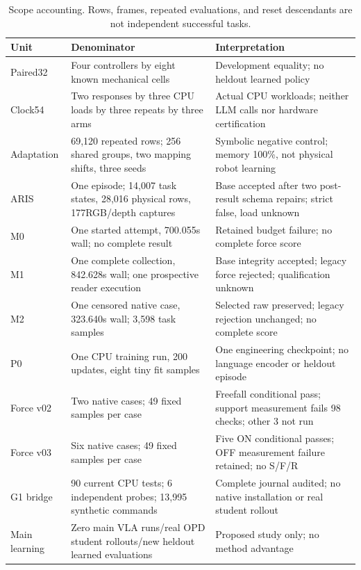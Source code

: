 \documentclass{article}
\begin{document}
\begin{table}[h]
\caption{Scope accounting. Rows, frames, repeated evaluations, and reset descendants are not independent successful tasks.}
\centering\small
\begin{tabular}{p{}p{}p{}}\toprule
Unit&Denominator&Interpretation\\\midrule
Paired32&Four controllers by eight known mechanical cells&Development equality; no heldout learned policy\\
Clock54&Two responses by three CPU loads by three repeats by three arms&Actual CPU workloads; neither LLM calls nor hardware certification\\
Adaptation&69,120 repeated rows; 256 shared groups, two mapping shifts, three seeds&Symbolic negative control; memory 100\%, not physical robot learning\\
ARIS&One episode; 14,007 task states, 28,016 physical rows, 177RGB/depth captures&Base accepted after two post-result schema repairs; strict false, load unknown\\
M0&One started attempt, 700.055s wall; no complete result&Retained budget failure; no complete force score\\
M1&One complete collection, 842.628s wall; one prospective reader execution&Base integrity accepted; legacy force rejected; qualification unknown\\
M2&One censored native case, 323.640s wall; 3,598 task samples&Selected raw preserved; legacy rejection unchanged; no complete score\\
P0&One CPU training run, 200 updates, eight tiny fit samples&One engineering checkpoint; no language encoder or heldout episode\\
Force v02&Two native cases; 49 fixed samples per case&Freefall conditional pass; support measurement fails 98 checks; other 3 not run\\
Force v03&Six native cases; 49 fixed samples per case&Five ON conditional passes; OFF measurement failure retained; no S/F/R\\
G1 bridge&90 current CPU tests; 6 independent probes; 13,995 synthetic commands&Complete journal audited; no native installation or real student rollout\\
Main learning&Zero main VLA runs/real OPD student rollouts/new heldout learned evaluations&Proposed study only; no method advantage\\\bottomrule
\end{tabular}
\end{table}
\end{document}
